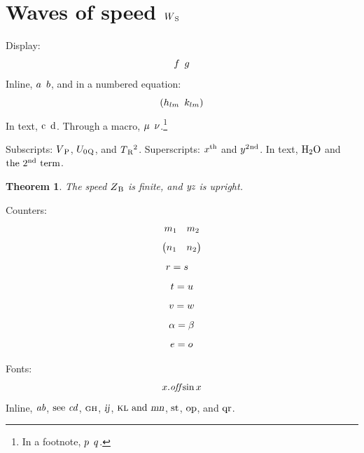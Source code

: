 \documentclass{article}
\newtheorem{theorem}{Theorem}
\newcommand\sep{\enskip}
\begin{document}
\section{Waves of speed $W\textsubscript{S}$}
Display:
\[ f \enskip g \]
Inline, $a \enskip b$, and in a numbered equation:
\begin{equation}
\left( h_{lm} \enskip k_{lm} \right)
\end{equation}
In text, $\text{c\enskip d}$. Through a macro, $\mu \sep \nu$.\footnote{In a footnote, $p \enskip q$.}

Subscripts: $V\textsubscript{P}$, $U_{0}\textsubscript{Q}$, and
$T\textsubscript{R}^{2}$. Superscripts: $x\textsuperscript{th}$ and
$y^{2}\textsuperscript{nd}$. In text, $\text{H\textsubscript{2}O}$ and
$\text{the 2\textsuperscript{nd} term}$.
\begin{theorem}
The speed $Z\textsubscript{B}$ is finite, and $\emph{yz}$ is upright.
\end{theorem}

Counters:
\begin{equation*}
\setcounter{MaxMatrixCols}{20}
\begin{matrix} m_1 & m_2 \end{matrix}
\end{equation*}
\begin{equation*}
\begin{pmatrix} n_1 \setcounter{MaxMatrixCols}{20} & n_2 \end{pmatrix}
\end{equation*}
\begin{align*}
\setcounter{MaxMatrixCols}{20} r &= s
\end{align*}
\begin{equation}
\addtocounter{equation}{4} t = u
\end{equation}
\begin{equation*}
\stepcounter{equation} v = w
\end{equation*}
\begin{equation}
\addtocounter{equation}{-1} \alpha = \beta
\end{equation}
\begin{equation*}
\refstepcounter{equation} e = o
\end{equation*}

Fonts:
\begin{equation}
x.\emph{of\kern0pt f}\sin x
\end{equation}
Inline, $\emph{ab}$, $\text{see \emph{cd}}$, $\textsc{gh}$, $\textsl{ij}$,
$\text{\textsc{kl} and \textsl{mn}}$, $\textmd{st}$, $\textup{op}$, and $\textnormal{qr}$.
\end{document}
